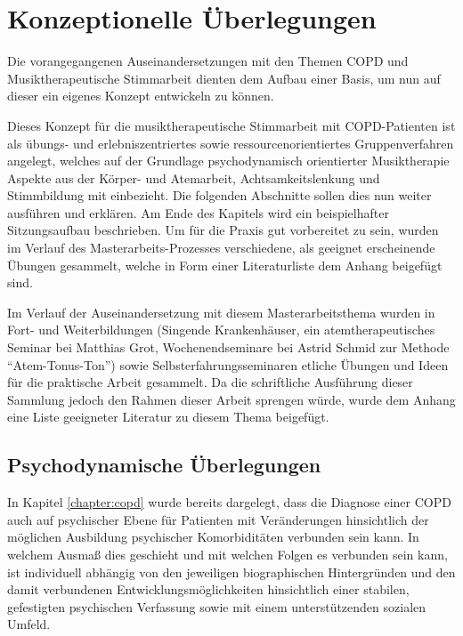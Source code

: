 \ifpdf
    \graphicspath{{4_konzept/figures/PNG/}{4_konzept/figures/PDF/}{4_konzept/figures/}}
\else
    \graphicspath{{4_konzept/figures/EPS/}{4_konzept/figures/}}
\fi

\chapter{Konzeptionelle \"Uberlegungen}
\label{chapter:konzeptionelle_ueberlegungen}
Die vorangegangenen Auseinandersetzungen mit den Themen COPD und Musiktherapeutische Stimmarbeit dienten dem Aufbau einer Basis, um nun auf dieser ein eigenes Konzept entwickeln zu können. 

Dieses Konzept für die musiktherapeutische Stimmarbeit mit COPD-Patienten ist als übungs- und erlebniszentriertes sowie ressourcenorientiertes Gruppenverfahren angelegt, welches auf der Grundlage psychodynamisch orientierter Musiktherapie Aspekte aus der Körper- und Atemarbeit, Achtsamkeitslenkung und Stimmbildung mit einbezieht. Die folgenden Abschnitte sollen dies nun weiter ausführen und erklären. Am Ende des Kapitels wird ein beispielhafter Sitzungsaufbau beschrieben. Um für die Praxis gut vorbereitet zu sein, wurden im Verlauf des Masterarbeits-Prozesses verschiedene, als geeignet erscheinende Übungen gesammelt, welche in Form einer Literaturliste dem Anhang beigefügt sind.

Im Verlauf der Auseinandersetzung mit diesem Masterarbeitsthema wurden in Fort- und Weiterbildungen (Singende Krankenhäuser, ein atemtherapeutisches Seminar bei Matthias Grot, Wochenendseminare bei Astrid Schmid zur Methode "`Atem-Tonus-Ton"') sowie Selbsterfahrungsseminaren etliche Übungen und Ideen für die praktische Arbeit gesammelt. Da die schriftliche Ausführung dieser Sammlung jedoch den Rahmen dieser Arbeit sprengen würde, wurde dem Anhang eine Liste geeigneter Literatur zu diesem Thema beigefügt.

\section{Psychodynamische \"Uberlegungen}
\label{psychodynamische_ueberlegungen}
In Kapitel \ref{chapter:copd} wurde bereits dargelegt, dass die Diagnose einer COPD auch auf psychischer Ebene für Patienten mit Veränderungen hinsichtlich der möglichen Ausbildung psychischer Komorbiditäten verbunden sein kann. In welchem Ausmaß dies geschieht und mit welchen Folgen es verbunden sein kann, ist individuell abhängig von den jeweiligen biographischen Hintergründen und den damit verbundenen Entwicklungsmöglichkeiten hinsichtlich einer stabilen, gefestigten psychischen Verfassung sowie mit einem unterstützenden sozialen Umfeld.

